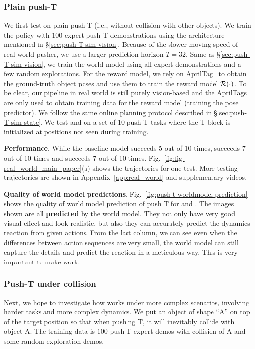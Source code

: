 \subsubsection{Plain push-T}
We first test on plain push-T (i.e., without collision with other objects). We train the policy with $100$ expert push-T demonstrations using the architecture mentioned in \S\ref{sec:push-T-sim-vision}. Because of the slower moving speed of real-world pusher, we use a larger prediction horizon $T=32$. Same as \S\ref{sec:push-T-sim-vision}, we train the world model using all expert demonstrations and a few random explorations. For the reward model, we rely on AprilTag~\citep{olson2011apriltag} to obtain the ground-truth object poses and use them to train the reward model ${\cal R}(\cdot)$. To be clear, our \nameshort pipeline in real world is still purely vision-based and the AprilTags are only used to obtain training data for the reward model (training the pose predictor). We follow the same online planning protocol described in \S\ref{sec:push-T-sim-state}. 
We test \gpcrank and \gpcopt on a set of 10 push-T tasks where the T block is initialized at positions not seen during training. 

\textbf{Performance}.
While the baseline model succeeds 5 out of 10 times, \gpcrank succeeds 7 out of 10 times and \gpcopt succeeds 7 out of 10 times. Fig.~\ref{fig:fig-real_world_main_paper}(a) shows the trajectories for one test. More testing trajectories are shown in Appendix~\ref{app:real_world} and supplementary videos.


\textbf{Quality of world model predictions}.
Fig.~\ref{fig:push-t-worldmodel-prediction} shows the quality of world model prediction of push T for \gpcrank and \gpcopt. The images shown are all \textbf{predicted} by the world model. They not only have very good visual effect and look realistic, but also they can accurately predict the dynamics reaction from given actions. From the last column, we can see even when the differences between action sequences are very small, the world model can still capture the details and predict the reaction in a meticulous way. This is very important to make \nameshort work. 

\subsubsection{Push-T under collision}
Next, we hope to investigate how \nameshort works under more complex scenarios, involving harder tasks and more complex dynamics. We put an object of shape ``A'' on top of the target position so that when pushing T, it will inevitably collide with object A. The training data is $100$ push-T expert demos with collision of A and some random exploration demos. 

